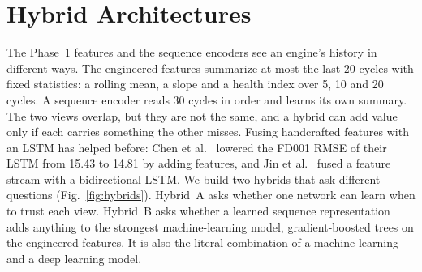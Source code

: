 
\section{Hybrid Architectures}
\label{sec:hybrid}

The Phase~1 features and the sequence encoders see an engine's history in
different ways. The engineered features summarize at most the last 20 cycles
with fixed statistics: a rolling mean, a slope and a health index over 5, 10
and 20 cycles. A sequence encoder reads 30 cycles in order and learns its own
summary. The two views overlap, but they are not the same, and a hybrid can add
value only if each carries something the other misses. Fusing handcrafted
features with an LSTM has helped before: Chen et al.~\cite{Chen2021machine}
lowered the FD001 RMSE of their LSTM from 15.43 to 14.81 by adding features,
and Jin et al.~\cite{Jin2022bilstm} fused a feature stream with a
bidirectional LSTM. We build two hybrids that ask different questions
(Fig.~\ref{fig:hybrids}). Hybrid~A asks whether one network can learn when to
trust each view. Hybrid~B asks whether a learned sequence representation adds
anything to the strongest machine-learning model, gradient-boosted trees on
the engineered features. It is also the literal combination of a machine
learning and a deep learning model.

